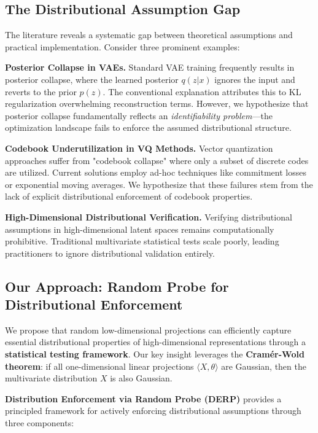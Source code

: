 \documentclass{article}
\begin{document}
\subsection{The Distributional Assumption Gap}

The literature reveals a systematic gap between theoretical assumptions and practical implementation. Consider three prominent examples:

\textbf{Posterior Collapse in VAEs.} Standard VAE training frequently results in posterior collapse, where the learned posterior $q(z|x)$ ignores the input and reverts to the prior $p(z)$. The conventional explanation attributes this to KL regularization overwhelming reconstruction terms. However, we hypothesize that posterior collapse fundamentally reflects an \emph{identifiability problem}—the optimization landscape fails to enforce the assumed distributional structure.

\textbf{Codebook Underutilization in VQ Methods.} Vector quantization approaches suffer from "codebook collapse" where only a subset of discrete codes are utilized. Current solutions employ ad-hoc techniques like commitment losses or exponential moving averages. We hypothesize that these failures stem from the lack of explicit distributional enforcement of codebook properties.

\textbf{High-Dimensional Distributional Verification.} Verifying distributional assumptions in high-dimensional latent spaces remains computationally prohibitive. Traditional multivariate statistical tests scale poorly, leading practitioners to ignore distributional validation entirely.

\subsection{Our Approach: Random Probe for Distributional Enforcement}

We propose that random low-dimensional projections can efficiently capture essential distributional properties of high-dimensional representations through a \textbf{statistical testing framework}. Our key insight leverages the \textbf{Cramér-Wold theorem}: if all one-dimensional linear projections $\langle X,\theta \rangle$ are Gaussian, then the multivariate distribution $X$ is also Gaussian.

\textbf{Distribution Enforcement via Random Probe (DERP)} provides a principled framework for actively enforcing distributional assumptions through three components:
\end{document}
